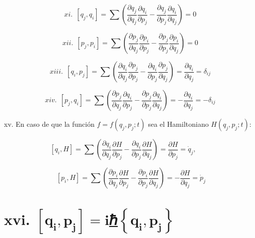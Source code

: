 \documentclass[]{article}
\begin{document}
\[xi.\ \ \left\lbrack q_{j},q_{i} \right\rbrack = \sum_{}^{}\left( \frac{\partial q_{j}}{\partial q_{j}}\frac{\partial q_{i}}{\partial p_{j}} - \frac{\partial q_{j}}{\partial p_{j}}\frac{\partial q_{i}}{\partial q_{j}} \right) = 0\]

\[xii.\ \ \left\lbrack p_{j},p_{i} \right\rbrack = \sum_{}^{}\left( \frac{\partial p_{j}}{\partial q_{j}}\frac{\partial p_{i}}{\partial p_{j}} - \frac{\partial p_{j}}{\partial p_{j}}\frac{\partial p_{i}}{\partial q_{j}} \right) = 0\]

\[xiii.\ \ \left\lbrack q_{i},p_{j} \right\rbrack = \sum_{}^{}\left( \frac{\partial q_{i}}{\partial q_{j}}\frac{\partial p_{j}}{\partial p_{j}} - \frac{\partial q_{i}}{\partial p_{j}}\frac{\partial p_{j}}{\partial q_{j}} \right) = \frac{\partial q_{i}}{\partial q_{j}} = \delta_{ij}\]

\[xiv.\ \ \left\lbrack p_{j},q_{i} \right\rbrack = \sum_{}^{}\left( \frac{\partial p_{j}}{\partial q_{j}}\frac{\partial q_{i}}{\partial p_{j}} - \frac{\partial p_{j}}{\partial p_{j}}\frac{\partial q_{i}}{\partial q_{j}} \right) = - \frac{\partial q_{i}}{\partial q_{j}} = - \delta_{ij}\]

xv. En caso de que la función \(f = f\left( q_{j},p_{j};t \right)\) sea
el Hamiltoniano \(H\left( q_{j},p_{j};t \right)\):

\[\left\lbrack q_{i},H \right\rbrack = \sum_{}^{}\left( \frac{\partial q_{i}}{\partial q_{j}}\frac{\partial H}{\partial p_{j}} - \frac{\partial q_{i}}{\partial p_{j}}\frac{\partial H}{\partial q_{j}} \right) = \frac{\partial H}{\partial p_{j}} = {\dot{q}}_{j},\ \ \ \ \ \ \ \ \ \]

\[\ \left\lbrack p_{i},H \right\rbrack = \sum_{}^{}\left( \frac{\partial p_{i}}{\partial q_{j}}\frac{\partial H}{\partial p_{j}} - \frac{\partial p_{i}}{\partial p_{j}}\frac{\partial H}{\partial q_{j}} \right) = - \frac{\partial H}{\partial q_{j}} = {\dot{p}}_{j}\]

\hypertarget{xvi.-leftlbrack-mathbfq_mathbfimathbfmathbfp_mathbfj-rightrbrackmathbf-iux210fleft-mathbfq_mathbfimathbfmathbfp_mathbfj-right}{%
\section{\texorpdfstring{xvi.
\(\left\lbrack \mathbf{q}_{\mathbf{i}}\mathbf{,}\mathbf{p}_{\mathbf{j}} \right\rbrack\mathbf{= i}\)\href{http://tex.stackexchange.com/questions/171088/how-can-i-typeset-the-reduced-planck-constant-\%e2\%84\%8f}{ℏ}\(\left\{ \mathbf{q}_{\mathbf{i}}\mathbf{,}\mathbf{p}_{\mathbf{j}} \right\}\)}{xvi. \textbackslash left\textbackslash lbrack \textbackslash mathbf\{q\}\_\{\textbackslash mathbf\{i\}\}\textbackslash mathbf\{,\}\textbackslash mathbf\{p\}\_\{\textbackslash mathbf\{j\}\} \textbackslash right\textbackslash rbrack\textbackslash mathbf\{= i\}ℏ\textbackslash left\textbackslash\{ \textbackslash mathbf\{q\}\_\{\textbackslash mathbf\{i\}\}\textbackslash mathbf\{,\}\textbackslash mathbf\{p\}\_\{\textbackslash mathbf\{j\}\} \textbackslash right\textbackslash\}}}\label{xvi.-leftlbrack-mathbfq_mathbfimathbfmathbfp_mathbfj-rightrbrackmathbf-iux210fleft-mathbfq_mathbfimathbfmathbfp_mathbfj-right}}
\end{document}
